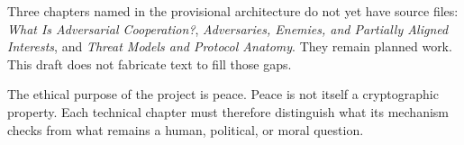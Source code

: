 Three chapters named in the provisional architecture do not yet have source
files: \emph{What Is Adversarial Cooperation?}, \emph{Adversaries, Enemies,
and Partially Aligned Interests}, and \emph{Threat Models and Protocol
Anatomy}. They remain planned work. This draft does not fabricate text to fill
those gaps.

The ethical purpose of the project is peace. Peace is not itself a
cryptographic property. Each technical chapter must therefore distinguish
what its mechanism checks from what remains a human, political, or moral
question.
